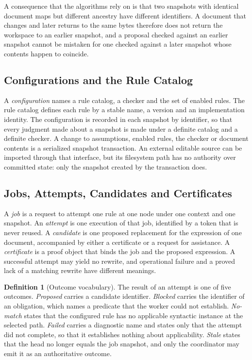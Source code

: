\documentclass[11pt,a4paper]{article}
\theoremstyle{plain}
\theoremstyle{definition}
\newtheorem{definition}[theorem]{Definition}
\theoremstyle{remark}
\theoremstyle{definition}
\begin{document}
A consequence that the algorithms rely on is that two snapshots with identical document maps but different ancestry have different identifiers. A document that changes and later returns to the same bytes therefore does not return the workspace to an earlier snapshot, and a proposal checked against an earlier snapshot cannot be mistaken for one checked against a later snapshot whose contents happen to coincide.

\subsection{Configurations and the Rule Catalog}

A \emph{configuration} names a rule catalog, a checker and the set of enabled rules. The rule catalog defines each rule by a stable name, a version and an implementation identity. The configuration is recorded in each snapshot by identifier, so that every judgment made about a snapshot is made under a definite catalog and a definite checker. A change to assumptions, enabled rules, the checker or document contents is a serialized snapshot transaction. An external editable source can be imported through that interface, but its filesystem path has no authority over committed state: only the snapshot created by the transaction does.

\subsection{Jobs, Attempts, Candidates and Certificates}

A \emph{job} is a request to attempt one rule at one node under one context and one snapshot. An \emph{attempt} is one execution of that job, identified by a token that is never reused. A \emph{candidate} is one proposed replacement for the expression of one document, accompanied by either a certificate or a request for assistance. A \emph{certificate} is a proof object that binds the job and the proposed expression. A successful attempt may yield no rewrite, and operational failure and a proved lack of a matching rewrite have different meanings.

\begin{definition}[Outcome vocabulary]
\label{def:outcomes}
The result of an attempt is one of five outcomes. \emph{Proposed} carries a candidate identifier. \emph{Blocked} carries the identifier of an obligation, which names a predicate that the worker could not establish. \emph{No-match} states that the configured rule has no applicable syntactic instance at the selected path. \emph{Failed} carries a diagnostic name and states only that the attempt did not complete, so that it establishes nothing about applicability. \emph{Stale} states that the head no longer equals the job snapshot, and only the coordinator may emit it as an authoritative outcome.
\end{definition}
\end{document}
